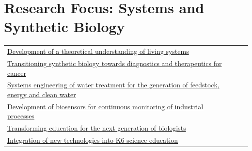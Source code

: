 \documentclass[11pt,a4paper,sans]{moderncv}        %
\begin{document}
\makecvtitle

\vspace{-.5in}
\section{Research Focus: Systems and Synthetic Biology}
\begin{tabular}{lll} 
\href{http://qbio.ucsd.edu}{Development of a theoretical understanding of living systems}\\
\href{http://gencirq.com}{Transitioning synthetic biology towards diagnostics and therapeutics for cancer}\\
\href{https://www.qbisci.com/fiscalini-dairy}{Systems engineering of water treatment for the generation of feedstock, energy and clean water}\\
\href{https://www.qbisci.com/sensors/}{Development of biosensors for continuous monitoring of industrial processes}\\
\href{https://qbio.ucsd.edu}{Transforming education for the next generation of biologists}\\
\href{http://biocircuits.sdsc.edu/outreach/}{Integration of new technologies into K6 science education}\\
\end{tabular}\\

\end{document}
